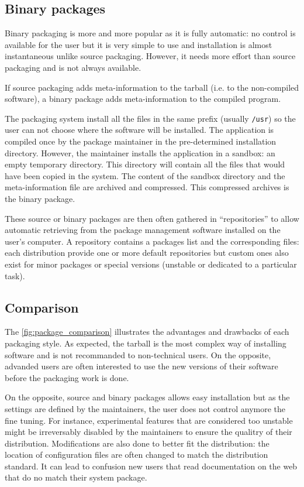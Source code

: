 \subsection{Binary packages}


Binary packaging is more and more popular as it is fully automatic: no
control is available for the user but it is very simple to use and
installation is almost instantaneous unlike source packaging. However,
it needs more effort than source packaging and is not always
available.


If source packaging adds meta-information to the tarball (i.e. to the
non-compiled software), a binary package adds meta-information to the
compiled program.

The packaging system install all the files in the same prefix (usually
\texttt{/usr}) so the user can not choose where the
software will be installed. The application is compiled once by the
package maintainer in the pre-determined installation directory.
However, the maintainer installs the application in a sandbox: an
empty temporary directory.  This directory will contain all the files
that would have been copied in the system. The content of the sandbox
directory and the meta-information file are archived and compressed.
This compressed archives is the binary package.


These source or binary packages are then often gathered in
``repositories'' to allow automatic retrieving from the package
management software installed on the user's computer.  A repository
contains a packages list and the corresponding files: each
distribution provide one or more default repositories but custom ones
also exist for minor packages or special versions (unstable or
dedicated to a particular task).


\subsection{Comparison}

The \autoref{fig:package_comparison} illustrates the advantages and
drawbacks of each packaging style. As expected, the tarball is the
most complex way of installing software and is not recommanded to
non-technical users. On the opposite, advanded users are often
interested to use the new versions of their software before the
packaging work is done.


On the opposite, source and binary packages allows easy installation
but as the settings are defined by the maintainers, the user does not
control anymore the fine tuning. For instance, experimental features
that are considered too unstable might be irreversably disabled by the
maintainers to ensure the qualitry of their \linux
distribution. Modifications are also done to better fit the
distribution: the location of configuration files are often changed to
match the distribution standard. It can lead to confusion new users
that read documentation on the web that do no match their system
package.


